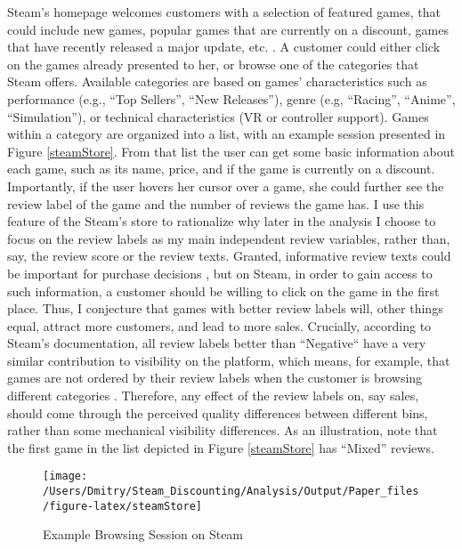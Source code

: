 \documentclass[12pt,pagebackref]{article}
\begin{document}
Steam's homepage welcomes customers with a selection of featured games,
that could include new games, popular games that are currently on a
discount, games that have recently released a major update, etc.
\citep{steamVisibility}. A customer could either click on the games
already presented to her, or browse one of the categories that Steam
offers. Available categories are based on games' characteristics such as
performance (e.g., ``Top Sellers'', ``New Releases''), genre (e.g,
``Racing'', ``Anime'', ``Simulation''), or technical characteristics (VR
or controller support). Games within a category are organized into a
list, with an example session presented in Figure \ref{steamStore}. From
that list the user can get some basic information about each game, such
as its name, price, and if the game is currently on a discount.
Importantly, if the user hovers her cursor over a game, she could
further see the review label of the game and the number of reviews the
game has. I use this feature of the Steam's store to rationalize why
later in the analysis I choose to focus on the review labels as my main
independent review variables, rather than, say, the review score or the
review texts. Granted, informative review texts could be important for
purchase decisions \citep{ChevalierMayzlin06}, but on Steam, in order to
gain access to such information, a customer should be willing to click
on the game in the first place. Thus, I conjecture that games with
better review labels will, other things equal, attract more customers,
and lead to more sales. Crucially, according to Steam's documentation,
all review labels better than ``Negative`` have a very similar
contribution to visibility on the platform, which means, for example,
that games are not ordered by their review labels when the customer is
browsing different categories \citeyearpar{steamVisibility2}. Therefore,
any effect of the review labels on, say sales, should come through the
perceived quality differences between different bins, rather than some
mechanical visibility differences. As an illustration, note that the
first game in the list depicted in Figure \ref{steamStore} has ``Mixed''
reviews.

\begin{figure}[h]
 
 {\centering \texttt{[image: /Users/Dmitry/Steam\_Discounting/Analysis/Output/Paper\_files/figure-latex/steamStore]} 
 
 }
 
 \caption{\label{steamStore}Example Browsing Session on Steam}\label{fig:unnamed-chunk-3}
 \end{figure}
\end{document}
